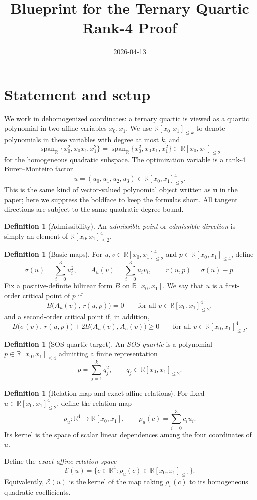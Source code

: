 \documentclass[10pt]{article}
\title{Blueprint for the Ternary Quartic Rank-4 Proof}
\date{2026-04-13}
\theoremstyle{definition}
\newtheorem{definition}[theorem]{Definition}
\newcommand{\R}{\mathbb{R}}
\newcommand{\vecp}[1]{\boldsymbol{\mathbf{#1}}}
\newcommand{\Poly}{\R[x_0,x_1]}
\newcommand{\Quad}{\Poly_{\le 2}}
\newcommand{\Quart}{\Poly_{\le 4}}
\newcommand{\Aff}{\Poly_{\le 1}}
\newcommand{\HomQ}{\operatorname{span}_{\R}\{x_0^2,x_0x_1,x_1^2\}}
\DeclareMathOperator{\mspan}{span}
\newcommand{\sig}{\sigma}
\newcommand{\rel}{\rho}
\newcommand{\Exact}{\mathcal{E}}
\begin{document}
\maketitle

\section{Statement and setup}\label{sec:setup}
We work in dehomogenized coordinates: a ternary quartic is viewed as a quartic
polynomial in two affine variables \(x_0,x_1\). We use $\R[x_0,x_1]_{\le k}$ to
denote polynomials in these variables with degree at most $k$, and
\[
  \HomQ=\mspan_{\R}\{x_0^2,x_0x_1,x_1^2\}\subset \Quad
\]
for the homogeneous quadratic subspace. The optimization variable is a rank-$4$
Burer--Monteiro factor
\[
  u=(u_0,u_1,u_2,u_3)\in \Quad^4.
\]
This is the same kind of vector-valued polynomial object written as
\(\vecp{u}\) in the paper; here we suppress the boldface to keep the formulas
short. All tangent directions are subject to the same quadratic degree bound.

\begin{definition}[Admissibility]
\label{def:admissible}
An \emph{admissible point} or \emph{admissible direction} is simply an element
of \(\Quad^4\).
\end{definition}

\begin{definition}[Basic maps]
\label{def:basic-maps}
For \(u,v\in \Quad^4\) and \(p\in \Quart\), define
\[
  \sig(u)=\sum_{i=0}^3 u_i^2,\qquad
  A_u(v)=\sum_{i=0}^3 u_i v_i,\qquad
  r(u,p)=\sig(u)-p.
\]
Fix a positive-definite bilinear form \(B\) on \(\Poly\). We say that \(u\) is
a first-order critical point of \(p\) if
\[
  B\bigl(A_u(v),\,r(u,p)\bigr)=0
  \qquad\text{for all }v\in \Quad^4,
\]
and a second-order critical point if, in addition,
\[
  B\bigl(\sig(v),\,r(u,p)\bigr)+2B\bigl(A_u(v),A_u(v)\bigr)\ge 0
  \qquad\text{for all }v\in \Quad^4.
\]
\end{definition}

\begin{definition}[SOS quartic target]
\label{def:sos}
An \emph{SOS quartic} is a polynomial \(p\in \Quart\) admitting a finite
representation
\[
  p=\sum_{j=1}^k q_j^2,\qquad q_j\in \Quad .
\]
\end{definition}

\begin{definition}[Relation map and exact affine relations]
\label{def:relation-poly-lin}
For fixed \(u\in \Quad^4\), define the relation map
\[
  \rel_u:\R^4\to \Poly,\qquad \rel_u(c)=\sum_{i=0}^3 c_i u_i.
\]
Its kernel is the space of scalar linear dependences among the four coordinates
of \(u\).

Define the \emph{exact affine relation space}
\[
  \Exact(u)=\{c\in \R^4:\rel_u(c)\in \Aff\}.
\]
Equivalently, \(\Exact(u)\) is the kernel of the map taking
\(\rel_u(c)\) to its homogeneous quadratic coefficients.
\end{definition}
\end{document}
